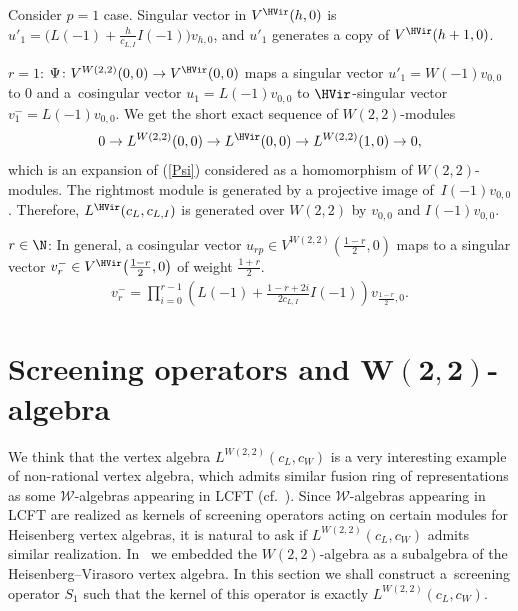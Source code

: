 \begin{Example} \label{verma_prim}
Consider $p=1$ case. Singular vector in $V^{\HVir}(h,0) $ is $u'_{1}=\big( L(-1) +\frac{h}{c_{L,I}}I(-1) \big) v_{h,0}$, and $u'_{1}$ generates a copy of $V^{\HVir}(h+1,0) $.

$r=1$: $\Psi \colon V^{W(2,2)}(0,0) \rightarrow V^{\HVir}(0,0) $ maps a singular vector $u'_1 = W(-1) v_{0,0}$ to $0$ and a~cosingular vector $u_1 = L(-1) v_{0,0}$ to $\HVir$-singular vector $v_1^- = L(-1) v_{0,0}$. We get the short exact sequence of $W(2,2)$-modules
\begin{gather*}
0\rightarrow L^{W(2,2)}(0,0) \rightarrow L^{\HVir}(0,0) \rightarrow L^{W(2,2)}(1,0) \rightarrow 0,
\end{gather*}
which is an expansion of (\ref{Psi}) considered as a homomorphism of $W(2,2)$-modules. The rightmost module is generated by a projective image of~$I(-1)v_{0,0}$. Therefore, $L^{\HVir}(c_L, c_{L,I})$ is generated over $W(2,2)$ by $v_{0,0}$ and $I(-1)v_{0,0}$.

$r\in \N$: In general, a cosingular vector $u_{rp}\in V^{W(2,2)}\left( \frac{1-r}{2},0\right) $ maps to a singular vector $v_r^- \in V^{
\HVir}\big( \frac{1-r}{2},0\big)$ of weight ${\frac{1+r}{2}}$.
\begin{gather*}
v_r^- = \prod\limits_{i=0}^{r-1}\left( L(-1) +\frac{1-r+2i}{2c_{L,I}}I(-1) \right) v_{\frac{1-r}{2},0}.
\end{gather*}
\end{Example}

\section[Screening operators and $W(2,2)$-algebra]{Screening operators and $\boldsymbol{W(2,2)}$-algebra}\label{screenings}

We think that the vertex algebra $L^{W(2,2)} (c_L, c_W) $ is a very interesting example of non-rational vertex algebra, which admits similar fusion ring of representations as some ${\mathcal W}$-algebras appearing in LCFT (cf.\ \cite{A1,AdM1,CM,FGST}). Since $\mathcal W$-algebras appearing in LCFT are realized as kernels of screening operators acting on certain modules for Heisenberg vertex algebras, it is natural to ask if $L^{W(2,2)} (c_L, c_W) $ admits similar realization. In~\cite{nas} we embedded the $W(2,2)$-algebra as a subalgebra of the Heisenberg--Virasoro vertex algebra. In this section we shall construct a~screening operator $S_1$ such that the kernel of this operator is exactly $L^{W(2,2)} (c_L, c_W) $.

